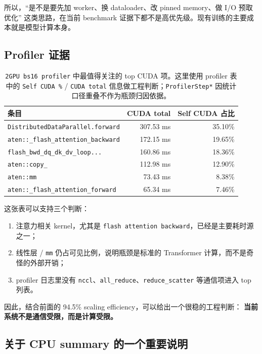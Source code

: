 \documentclass[11pt,a4paper]{ctexart}
\begin{document}
所以，“是不是要先加 worker、换 dataloader、改 pinned memory、做 I/O 预取优化”
这类思路，在当前 benchmark 证据下都不是高优先级。现有训练的主要成本就是模型计算本身。

\subsection{Profiler 证据}

\begin{table}[H]
\centering
\small
\caption{\texttt{2GPU bs16 profiler} 中最值得关注的 top CUDA 项。这里使用 profiler 表中的 \texttt{Self CUDA \%} / \texttt{CUDA total} 信息做工程判断；\texttt{ProfilerStep*} 因统计口径重叠不作为瓶颈归因依据。}
\begin{tabular}{lrr}
\toprule
条目 & CUDA total & Self CUDA 占比 \\
\midrule
\texttt{DistributedDataParallel.forward} & 307.53 ms & 35.10\% \\
\texttt{aten::\_flash\_attention\_backward} & 172.15 ms & 19.65\% \\
\texttt{flash\_bwd\_dq\_dk\_dv\_loop...} & 160.86 ms & 18.36\% \\
\texttt{aten::copy\_} & 112.98 ms & 12.90\% \\
\texttt{aten::mm} & 73.43 ms & 8.38\% \\
\texttt{aten::\_flash\_attention\_forward} & 65.34 ms & 7.46\% \\
\bottomrule
\end{tabular}
\end{table}

这张表可以支持三个判断：
\begin{enumerate}[leftmargin=2em]
  \item 注意力相关 kernel，尤其是 \texttt{flash attention backward}，已经是主要耗时源之一；
  \item 线性层 / \texttt{mm} 仍占可见比例，说明瓶颈是标准的 Transformer 计算，而不是奇怪的外部开销；
  \item profiler 日志里没有 \texttt{nccl}、\texttt{all\_reduce}、\texttt{reduce\_scatter} 等通信项进入 top 列表。
\end{enumerate}

因此，结合前面的 94.5\% scaling efficiency，可以给出一个很稳的工程判断：
\textbf{当前系统不是通信受限，而是计算受限。}

\subsection{关于 CPU summary 的一个重要说明}
\end{document}
